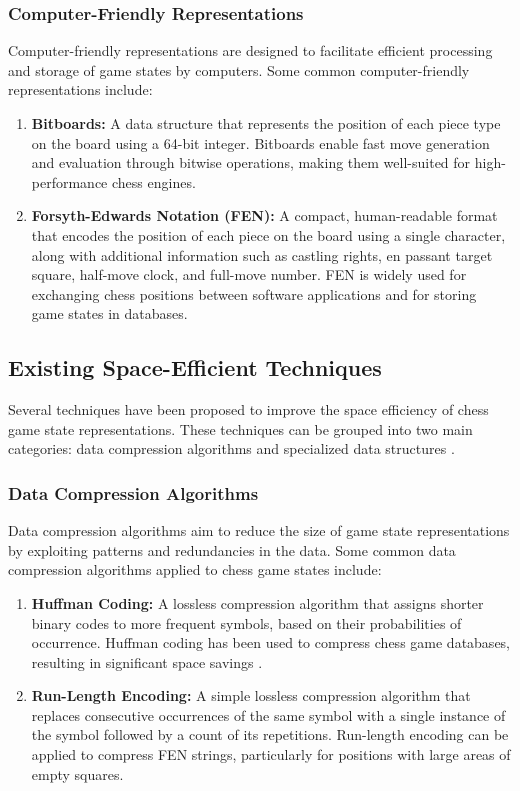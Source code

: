 \documentclass[journal]{journal}
\begin{document}
\subsubsection{Computer-Friendly Representations}  
Computer-friendly representations are designed to facilitate efficient processing and storage of game states by computers. Some common computer-friendly representations include:  
   
\begin{enumerate}  
  \item \textbf{Bitboards:} A data structure that represents the position of each piece type on the board using a 64-bit integer. Bitboards enable fast move generation and evaluation through bitwise operations, making them well-suited for high-performance chess engines.  
    
  \item \textbf{Forsyth-Edwards Notation (FEN):} A compact, human-readable format that encodes the position of each piece on the board using a single character, along with additional information such as castling rights, en passant target square, half-move clock, and full-move number. FEN is widely used for exchanging chess positions between software applications and for storing game states in databases.  
\end{enumerate}  

\subsection{Existing Space-Efficient Techniques}  
Several techniques have been proposed to improve the space efficiency of chess game state representations. These techniques can be grouped into two main categories: data compression algorithms and specialized data structures \cite{bell1990text}.  
   
\subsubsection{Data Compression Algorithms}  
Data compression algorithms aim to reduce the size of game state representations by exploiting patterns and redundancies in the data. Some common data compression algorithms applied to chess game states include:  
   
\begin{enumerate}  
  \item \textbf{Huffman Coding:} A lossless compression algorithm that assigns shorter binary codes to more frequent symbols, based on their probabilities of occurrence. Huffman coding has been used to compress chess game databases, resulting in significant space savings \cite{huffman1952method}.  
    
  \item \textbf{Run-Length Encoding:} A simple lossless compression algorithm that replaces consecutive occurrences of the same symbol with a single instance of the symbol followed by a count of its repetitions. Run-length encoding can be applied to compress FEN strings, particularly for positions with large areas of empty squares.  
\end{enumerate}  
   
\end{document}
